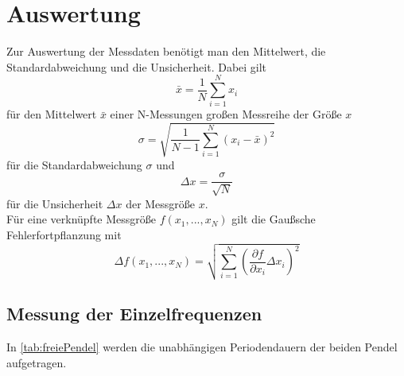 \section{Auswertung}
\label{sec:Auswertung}
Zur Auswertung der Messdaten benötigt man den Mittelwert, die Standardabweichung und die Unsicherheit. Dabei gilt
\begin{equation}
  \bar{x}=\dfrac{1}{N}\sum_{i=1}^N x_i
  \label{eq:mean}
\end{equation}
für den Mittelwert $\bar{x}$ einer N-Messungen großen Messreihe der Größe $x$
\begin{equation}
σ=\sqrt{\dfrac{1}{N-1}\sum_{i=1}^N(x_i-\bar{x})^2} 
\label{eq:std} 
\end{equation}
für die Standardabweichung $σ$ und
\begin{equation}
  Δx=\dfrac{σ}{\sqrt{N}}
  \label{eq:unc} 
\end{equation}
für die Unsicherheit $Δx$ der Messgröße $x$. \\

Für eine verknüpfte Messgröße $f(x_1,...,x_N)$ gilt die Gaußsche Fehlerfortpflanzung mit
\begin{equation}
Δf(x_1,...,x_N)=\sqrt{\sum_{i=1}^N (\frac{\partial f}{\partial x_i}Δx_i)^2}
\label{eq:gaussF}
\end{equation}

\newpage

\subsection{Messung der Einzelfrequenzen}
In \autoref{tab:freiePendel} werden die unabhängigen Periodendauern der beiden Pendel aufgetragen.

